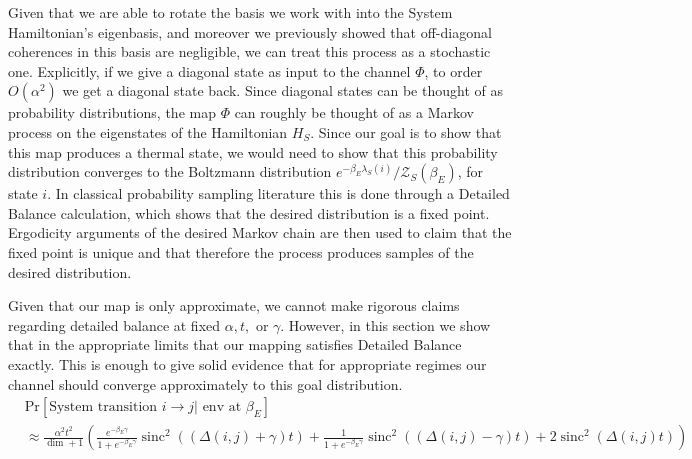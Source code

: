 \documentclass{article}
\newcommand{\parens}[1]{\left( #1 \right)}
\newcommand{\prob}[1]{\text{Pr}\left[ #1 \right]}
\newcommand{\bigo}[1]{O\left( #1 \right)}
\newcommand{\partfun}{\mathcal{Z}}
\DeclareMathOperator{\sinc}{sinc}
\begin{document}
Given that we are able to rotate the basis we work with into the System Hamiltonian's eigenbasis, and moreover we previously showed that off-diagonal coherences in this basis are negligible, we can treat this process as a stochastic one. Explicitly, if we give a diagonal state as input to the channel $\Phi$, to order $\bigo{\alpha^2}$ we get a diagonal state back. Since diagonal states can be thought of as probability distributions, the map $\Phi$ can roughly be thought of as a Markov process on the eigenstates of the Hamiltonian $H_S$. Since our goal is to show that this map produces a thermal state,
we would need to show that this probability distribution converges to the Boltzmann distribution $e^{-\beta_E \lambda_S(i)} / \partfun_S(\beta_E)$, for state $i$. In classical probability sampling literature this is done through a Detailed Balance calculation, which shows that the desired distribution is a fixed point. Ergodicity arguments of the desired Markov chain are then used to claim that the fixed point is unique and that therefore the process produces samples of the desired distribution.

Given that our map is only approximate, we cannot make rigorous claims regarding detailed balance at fixed $\alpha, t,$ or $\gamma$. However, in this section we show that in the appropriate limits that our mapping satisfies Detailed Balance exactly. This is enough to give solid evidence that for appropriate regimes our channel should converge approximately to this goal distribution.
\begin{align}
    &\prob{\text{System transition } i \to j | \text{ env at } \beta_E} \nonumber \\
    &\approx \frac{\alpha^2 t^2}{\dim + 1} \parens {\frac{e^{-\beta_E \gamma}}{1 + e^{-\beta_E \gamma}}  \sinc^2((\Delta(i,j) + \gamma)t) + \frac{1}{1 + e^{-\beta_E \gamma}} \sinc^2 ((\Delta(i,j) - \gamma)t) + 2 \sinc^2(\Delta(i,j) t)} \nonumber
\end{align}
\end{document}
